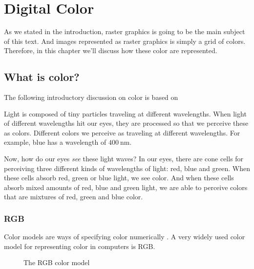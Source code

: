 \begin{comment}
  
\end{comment}

\chapter{Digital Color}
\label{cha:color}


As we stated in the introduction, raster graphics is going to be the
main subject of this text. And images represented as raster graphics
is simply a grid of colors. Therefore, in this chapter we'll discuss
how these color are represented.

\section{What is color?}

The following introductory discussion on color is based on
\cite{neider93:_openg_progr_guide,ohlsson99:_digit_bild_kreat,schanda97:_colorimetry,Cotton95colour,Pascale2003_ReviewRGBColourSpaces}

\newcommand{\bluewave}{\ensuremath{\SI{400}{\nano\meter}}}

Light is composed of tiny particles traveling at different
wavelengths. When light of different wavelengths hit
our eyes, they are processed so that we perceive these as
colors. Different colors we perceive as traveling at different
wavelengths. For example, blue has a wavelength of \bluewave.

Now, how do our eyes \textit{see} these light waves? In our eyes,
there are cone cells for perceiving three different kinds of
wavelengths of light: red, blue and green. When these cells absorb
red, green or blue light, we see color. And when these cells absorb
mixed amounts of red, blue and green light, we are able to perceive
colors that are mixtures of red, green and blue color.

\subsection{RGB}
\label{sec:rgb}

Color models are ways of specifying color numerically
\cite{hearn1997computer_graphics,Pascale2003_ReviewRGBColourSpaces}. A
very widely used color model for representing color in computers is
RGB.

\begin{figure}
  \centering
  \caption{The RGB color model}
  \label{fig:rgb}
\end{figure}

